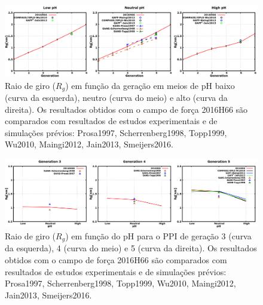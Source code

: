 \begin{figure}[ht!]
\centering
\includegraphics[width=\textwidth]{images/PME/PPIRg.png}
\caption{Raio de giro ($R_g$) em função da geração em meios de pH baixo (curva da esquerda), neutro (curva do meio) e alto (curva da direita).
Os resultados obtidos com o campo de força 2016H66\cite{Horta2016} são comparados com resultados de estudos experimentais e de simulações prévios:
Prosa1997\cite{Prosa1997}, %
Scherrenberg1998\cite{Scherrenberg1998}, %
Topp1999\cite{Topp1999}, %
Wu2010\cite{Wu2010}, %
Maingi2012\cite{Maingi2012}, %
Jain2013\cite{Jain2013}, %
Smeijers2016\cite{Smeijers2016}.} %
\label{supfig:PPIRg}
\end{figure}

\begin{figure}[ht!]
\centering
\includegraphics[width=\textwidth]{images/PME/PPIgyrateGpH.png}
\caption{Raio de giro ($R_g$) em função do pH para o PPI de geração 3 (curva da esquerda), 4 (curva do meio) e 5 (curva da direita).
Os resultados obtidos com o campo de força 2016H66\cite{Horta2016} são comparados com resultados de estudos experimentais e de simulações prévios:
Prosa1997\cite{Prosa1997}, %
Scherrenberg1998\cite{Scherrenberg1998}, %
Topp1999\cite{Topp1999}, %
Wu2010\cite{Wu2010}, %
Maingi2012\cite{Maingi2012}, %
Jain2013\cite{Jain2013}, %
Smeijers2016\cite{Smeijers2016}.} %
\label{supfig:PPIRgpH}
\end{figure}

